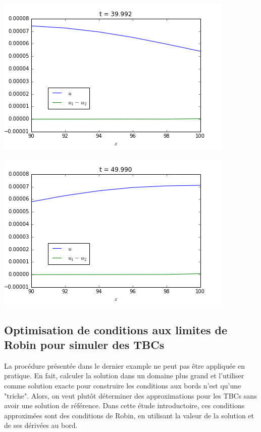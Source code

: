 \indent 

\begingroup
\noindent
	\begin{minipage}{.45\linewidth}
		\includegraphics[scale=.4]{figures/motivational2A.png}	
	\end{minipage}
	\hfill
	\begin{minipage}{.45\linewidth}
		\includegraphics[scale=.4]{figures/motivational2B.png}	
	\end{minipage}
\endgroup

\subsection{Optimisation de conditions aux limites de Robin pour simuler des TBCs}

\indent La procédure présentée dans le dernier example ne peut pas être appliquée en pratique. En fait, calculer la solution dans un domaine plus grand et l'utiliser comme solution exacte pour construire les conditions aux bords n'est qu'une "triche". Alors, on veut plutôt déterminer des approximations pour les TBCs sans avoir une solution de référence. Dans cette étude introductoire, ces conditions approximées sont des conditions de Robin, en utilisant la valeur de la solution et de ses dérivées au bord.


